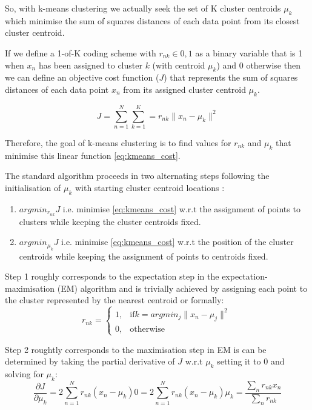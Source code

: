 So, with k-means clustering we actually seek the set of K cluster centroids \({\mu_{k}}\) 
which minimise the sum of squares distances of each data point from its closest cluster centroid.
\citep{Bishop2006}

If we define a 1-of-K coding scheme with \(r_{nk} \in {0,1}\) as a binary variable that is 1 when \(x_{n}\) has been
assigned to cluster \(k\) (with centroid \(\mu_{k}\)) and 0 otherwise then we can define an objective cost function (\(J\)) 
that represents the sum of squares distances of each data point \(x_{n}\) from its assigned cluster centroid \(\mu_{k}\).

\[ 
    J = \sum_{n=1}^{N}\sum_{k=1}^{K} = r_{nk} \|x_{n} - \mu_{k}\|^{2}
    \label{eq:kmeans_cost}
\]

Therefore, the goal of k-means clustering is to find values for \({r_{nk}}\) and \({\mu_{k}}\) that minimise this linear 
function \ref{eq:kmeans_cost}.
\citep{Bishop2006}


The standard algorithm proceeds in two alternating steps following the initialisation of \(\mu_{k}\) with starting
cluster centroid locations \citep{Forgy1965,Lloyd1982}:
\begin{enumerate}
    \item \(argmin_{r_{nk}} J\) i.e. minimise \ref{eq:kmeans_cost} w.r.t the assignment of points to clusters while keeping
        the cluster centroids fixed.
    \item \(argmin_{\mu_{k}} J\) i.e. minimise \ref{eq:kmeans_cost} w.r.t the position of the cluster centroids while keeping
        the assignment of points to centroids fixed.
\end{enumerate}

Step 1 roughly corresponds to the expectation step in the expectation-maximisation (EM) algorithm and is trivially achieved by 
assigning each point to the cluster represented by the nearest centroid or formally:
\[
    r_{nk} = 
    \begin{cases}
        1,& \text{if} k=argmin_{j} \|x_{n} - \mu_{j}\|^{2}\\
        0,& \text{otherwise}
    \end{cases}
\]

Step 2 roughtly corresponds to the maximisation step in EM is can be determined by taking the partial derivative of \(J\) w.r.t 
\(\mu_{k}\) setting it to 0 and solving for \(\mu_{k}\):
\[
    \frac{\partial J}{\partial \mu_{k}} = 2 \sum_{n=1}^{N} r_{nk} (x_{n} - \mu_{k})
    0 = 2 \sum_{n=1}^{N} r_{nk} (x_{n} - \mu_{k})
    \mu_{k} = \frac{\sum_{n} r_{nk}x_{n}}{\sum_{n} r_{nk}}
\]

